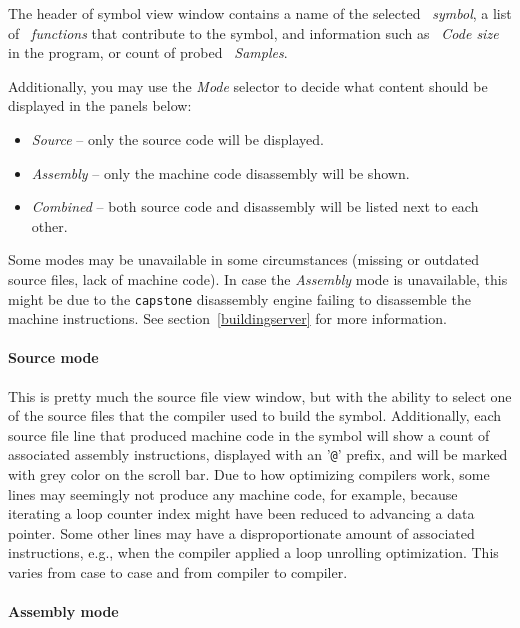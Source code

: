 \documentclass[hidelinks,titlepage,a4paper]{article}
\begin{document}
The header of symbol view window contains a name of the selected \emph{\faPuzzlePiece{}~symbol}, a list of \emph{\faSitemap{}~functions} that contribute to the symbol, and information such as \emph{\faWeightHanging{}~Code size} in the program, or count of probed \emph{\faEyeDropper{}~Samples}.

Additionally, you may use the \emph{Mode} selector to decide what content should be displayed in the panels below:

\begin{itemize}
\item \emph{Source} -- only the source code will be displayed.
\item \emph{Assembly} -- only the machine code disassembly will be shown.
\item \emph{Combined} -- both source code and disassembly will be listed next to each other.
\end{itemize}

Some modes may be unavailable in some circumstances (missing or outdated source files, lack of machine code). In case the \emph{Assembly} mode is unavailable, this might be due to the \texttt{capstone} disassembly engine failing to disassemble the machine instructions. See section~\ref{buildingserver} for more information.

\paragraph{Source mode}

This is pretty much the source file view window, but with the ability to select one of the source files that the compiler used to build the symbol. Additionally, each source file line that produced machine code in the symbol will show a count of associated assembly instructions, displayed with an '\texttt{@}' prefix, and will be marked with grey color on the scroll bar. Due to how optimizing compilers work, some lines may seemingly not produce any machine code, for example, because iterating a loop counter index might have been reduced to advancing a data pointer. Some other lines may have a disproportionate amount of associated instructions, e.g., when the compiler applied a loop unrolling optimization. This varies from case to case and from compiler to compiler.

\paragraph{Assembly mode}
\end{document}
